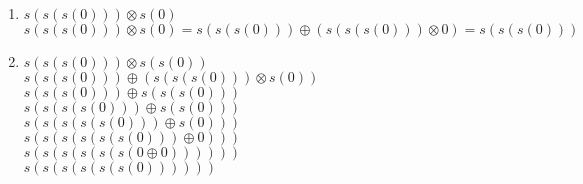 \documentclass{article}
\begin{document}
\begin{enumerate}
\item {$s(s(s(0)))\otimes s(0)$}
\\$s(s(s(0))) \otimes s(0) = s(s(s(0))) \oplus (s(s(s(0)))\otimes 0) = s(s(s(0)))$

\item {$s(s(s(0)))\otimes s(s(0))$}
\\$s(s(s(0))) \oplus (s(s(s(0))) \otimes s(0))$
\\$s(s(s(0))) \oplus s(s(s(0)))$
\\$s(s(s(s(0))) \oplus s(s(0)))$
\\$s(s(s(s(s(0))) \oplus s(0)))$
\\ $s(s(s(s(s(s(0))) \oplus 0)))$
\\$s(s(s(s(s(s(0 \oplus 0))))))$
\\$s(s(s(s(s(s(0))))))$
\end{enumerate}

\end{document}
